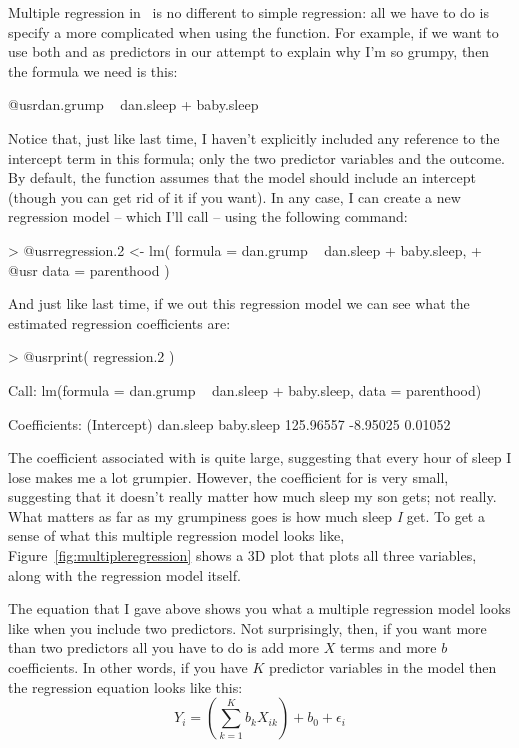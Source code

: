 Multiple regression in \R\ is no different to simple regression: all we have to do is specify a more complicated  when using the  function. For example, if we want to use both  and  as predictors in our attempt to explain why I'm so grumpy, then the formula we need is this:
\begin{rblock1}
                    @usr{dan.grump ~ dan.sleep + baby.sleep}
\end{rblock1}
Notice that, just like last time, I haven't explicitly included any reference to the intercept term in this formula; only the two predictor variables and the outcome. By default, the  function assumes that the model should include an intercept (though you can get rid of it if you want). In any case, I can create a new regression model -- which I'll call  -- using the following command:
\begin{rblock1}
> @usr{regression.2 <- lm( formula = dan.grump ~ dan.sleep + baby.sleep,}  
+ @usr{                    data = parenthood )}
\end{rblock1}
And just like last time, if we  out this regression model we can see what the estimated regression coefficients are:
\begin{rblock1}
> @usr{print( regression.2 )}

Call:
lm(formula = dan.grump ~ dan.sleep + baby.sleep, data = parenthood)

Coefficients:
(Intercept)    dan.sleep   baby.sleep  
  125.96557     -8.95025      0.01052  
\end{rblock1}
The coefficient associated with  is quite large, suggesting that every hour of sleep I lose makes me a lot grumpier. However, the coefficient for  is very small, suggesting that it doesn't really matter how much sleep my son gets; not really. What matters as far as my grumpiness goes is how much sleep {\it I} get. To get a sense of what this multiple regression model looks like, Figure~\ref{fig:multipleregression} shows a 3D plot that plots all three variables, along with the regression model itself. 


The equation that I gave above shows you what a multiple regression model looks like when you include two predictors. Not surprisingly, then, if you want more than two predictors all you have to do is add more $X$ terms and more $b$ coefficients. In other words, if you have $K$ predictor variables in the model then the regression equation looks like this:
$$
Y_i = \left( \sum_{k=1}^K b_{k} X_{ik} \right) + b_0 + \epsilon_i
$$





